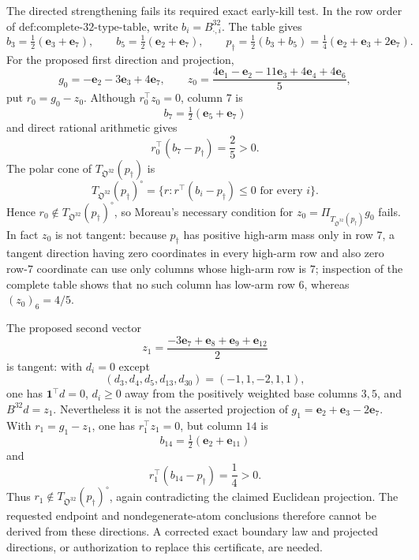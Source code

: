 The directed strengthening fails its required exact early-kill test.  In the row order of \(\text{def:complete-32-type-table}\), write \(b_i=B^{32}_{\cdot,i}\).  The table gives
\[
b_3=\tfrac12(\mathbf e_3+\mathbf e_7),\qquad
b_5=\tfrac12(\mathbf e_2+\mathbf e_7),\qquad
p_\dagger=\tfrac12(b_3+b_5)
=\tfrac14(\mathbf e_2+\mathbf e_3+2\mathbf e_7).
\]
For the proposed first direction and projection,
\[
g_0=-\mathbf e_2-3\mathbf e_3+4\mathbf e_7,
\qquad
z_0=\frac{4\mathbf e_1-\mathbf e_2-11\mathbf e_3+4\mathbf e_4+4\mathbf e_6}{5},
\]
put \(r_0=g_0-z_0\).  Although \(r_0^{\top}z_0=0\), column \(7\) is
\[
b_7=\tfrac12(\mathbf e_5+\mathbf e_7)
\]
and direct rational arithmetic gives
\[
r_0^{\top}(b_7-p_\dagger)=\frac25>0.
\]
The polar cone of \(T_{\mathfrak O^{32}}(p_\dagger)\) is
\[
T_{\mathfrak O^{32}}(p_\dagger)^\circ
=\{r:r^{\top}(b_i-p_\dagger)\leq0\text{ for every }i\}.
\]
Hence \(r_0\notin T_{\mathfrak O^{32}}(p_\dagger)^\circ\), so Moreau's necessary condition for \(z_0=\Pi_{T_{\mathfrak O^{32}}(p_\dagger)}g_0\) fails.  In fact \(z_0\) is not tangent: because \(p_\dagger\) has positive high-arm mass only in row \(7\), a tangent direction having zero coordinates in every high-arm row and also zero row-\(7\) coordinate can use only columns whose high-arm row is \(7\); inspection of the complete table shows that no such column has low-arm row \(6\), whereas \((z_0)_6=4/5\).

The proposed second vector
\[
z_1=\frac{-3\mathbf e_7+\mathbf e_8+\mathbf e_9+\mathbf e_{12}}2
\]
is tangent: with \(d_i=0\) except
\[
(d_3,d_4,d_5,d_{13},d_{30})=(-1,1,-2,1,1),
\]
one has \(\mathbf 1^{\top}d=0\), \(d_i\geq0\) away from the positively weighted base columns \(3,5\), and \(B^{32}d=z_1\).  Nevertheless it is not the asserted projection of \(g_1=\mathbf e_2+\mathbf e_3-2\mathbf e_7\).  With \(r_1=g_1-z_1\), one has \(r_1^{\top}z_1=0\), but column \(14\) is
\[
b_{14}=\tfrac12(\mathbf e_2+\mathbf e_{11})
\]
and
\[
r_1^{\top}(b_{14}-p_\dagger)=\frac14>0.
\]
Thus \(r_1\notin T_{\mathfrak O^{32}}(p_\dagger)^\circ\), again contradicting the claimed Euclidean projection.  The requested endpoint and nondegenerate-atom conclusions therefore cannot be derived from these directions.  A corrected exact boundary law and projected directions, or authorization to replace this certificate, are needed.


